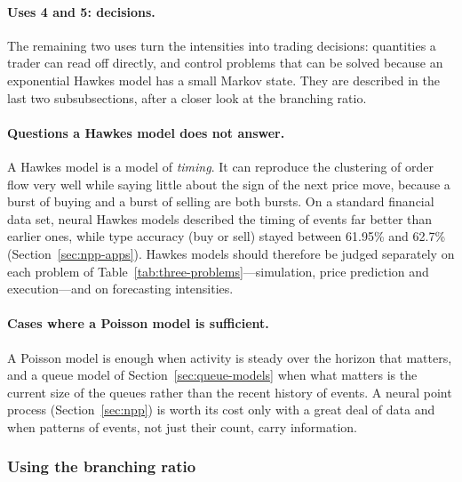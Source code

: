 \paragraph{Uses 4 and 5: decisions.} The remaining two uses turn the intensities into trading decisions:
quantities a trader can read off directly, and control problems that can be solved because an exponential
Hawkes model has a small Markov state. They are described in the last two subsubsections, after a closer look
at the branching ratio.

\paragraph{Questions a Hawkes model does not answer.} A Hawkes model is a model of \emph{timing}. It can reproduce the
clustering of order flow very well while saying little about the sign of the next price move, because a burst of
buying and a burst of selling are both bursts. On a standard financial data set, neural Hawkes models described
the timing of events far better than earlier ones, while type accuracy (buy or sell) stayed between 61.95\% and
62.7\% (Section~\ref{sec:npp-apps}). Hawkes models should therefore be judged separately on each problem
of Table~\ref{tab:three-problems}---simulation, price prediction and execution---and on forecasting
intensities.

\paragraph{Cases where a Poisson model is sufficient.} A Poisson model is enough when activity is steady over the horizon that
matters, and a queue model of Section~\ref{sec:queue-models} when what matters is the current size of the queues
rather than the recent history of events. A neural point process (Section~\ref{sec:npp}) is worth its cost only
with a great deal of data and when patterns of events, not just their count, carry information.

\subsubsection{Using the branching ratio}
\label{sec:hawkes-branching-use}

